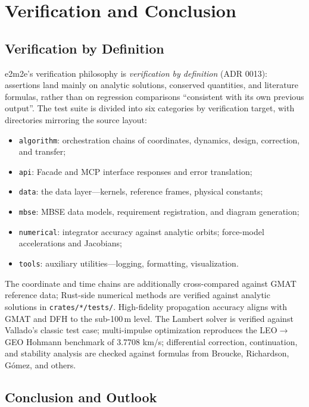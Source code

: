 \section{Verification and Conclusion}
\label{sec:verification}

\subsection{Verification by Definition}

e2m2e's verification philosophy is \emph{verification by definition}
(ADR 0013): assertions land mainly on analytic solutions, conserved
quantities, and literature formulas, rather than on regression comparisons
``consistent with its own previous output''. The test suite is divided into
six categories by verification target, with directories mirroring the source
layout:

\begin{itemize}
  \item \texttt{algorithm}: orchestration chains of coordinates, dynamics,
        design, correction, and transfer;
  \item \texttt{api}: Facade and MCP interface responses and error
        translation;
  \item \texttt{data}: the data layer---kernels, reference frames, physical
        constants;
  \item \texttt{mbse}: MBSE data models, requirement registration, and
        diagram generation;
  \item \texttt{numerical}: integrator accuracy against analytic orbits;
        force-model accelerations and Jacobians;
  \item \texttt{tools}: auxiliary utilities---logging, formatting,
        visualization.
\end{itemize}

The coordinate and time chains are additionally cross-compared against GMAT
reference data; Rust-side numerical methods are verified against analytic
solutions in \texttt{crates/*/tests/}. High-fidelity propagation accuracy
aligns with GMAT and DFH to the sub-100\,m level. The Lambert solver is
verified against Vallado's classic test case; multi-impulse optimization
reproduces the LEO$\to$GEO Hohmann benchmark of 3.7708 km/s; differential
correction, continuation, and stability analysis are checked against formulas
from Broucke, Richardson, G\'omez, and others.

\subsection{Conclusion and Outlook}

